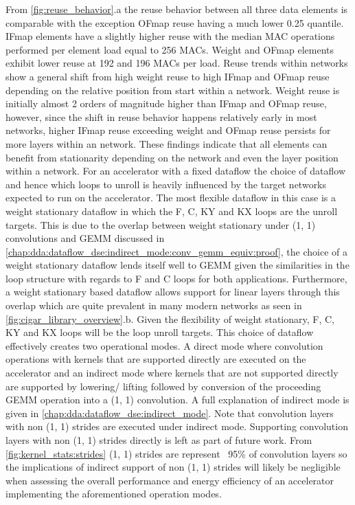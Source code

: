 From \autoref{fig:reuse_behavior}.a the reuse behavior between all three data
elements is comparable with the exception OFmap reuse having a much lower 0.25
quantile. IFmap elements have a slightly higher reuse with the median MAC
operations performed per element load equal to 256 MACs. Weight and OFmap
elements exhibit lower reuse at 192 and 196 MACs per load. Reuse trends within
networks show a general shift from high weight reuse to high IFmap and OFmap
reuse depending on the relative position from start within a network. Weight
reuse is initially almost 2 orders of magnitude higher than IFmap and OFmap
reuse, however, since the shift in reuse behavior happens relatively early in
most networks, higher IFmap reuse exceeding weight and OFmap reuse persists for
more layers within an network. These findings indicate that all elements can
benefit from stationarity depending on the network and even the layer position
within a network. For an accelerator with a fixed dataflow the choice of
dataflow and hence which loops to unroll is heavily influenced by the target
networks expected to run on the accelerator. The most flexible dataflow in this
case is a weight stationary dataflow in which the F, C, KY and KX loops are the
unroll targets. This is due to the overlap between weight stationary under (1, 1)
convolutions and GEMM discussed in
\autoref{chap:dda:dataflow_dse:indirect_mode:conv_gemm_equiv:proof}, the choice
of a weight stationary dataflow lends itself well to \ac{GEMM} given the
similarities in the loop structure with regards to F and C loops for both
applications. Furthermore, a weight stationary based dataflow allows support for
linear layers through this overlap which are quite prevalent in many modern
networks as seen in \autoref{fig:cigar_library_overview}.b. Given the
flexibility of weight stationary, F, C, KY and KX loops will be the loop unroll
targets. This choice of dataflow effectively creates two operational modes. A
direct mode where convolution operations with kernels that are supported
directly are executed on the accelerator and an indirect mode where kernels that
are not supported directly are supported by lowering/ lifting followed by
conversion of the proceeding GEMM operation into a (1, 1) convolution. A full
explanation of indirect mode is given in
\autoref{chap:dda:dataflow_dse:indirect_mode}. Note that convolution layers with
non (1, 1) strides are executed under indirect mode. Supporting convolution layers
with non (1, 1) strides directly is left as part of future work. From
\autoref{fig:kernel_stats:strides} (1, 1) strides are represent ~95\% of
convolution layers so the implications of indirect support of non (1, 1) strides
will likely be negligible when assessing the overall performance and energy
efficiency of an accelerator implementing the aforementioned operation modes.

